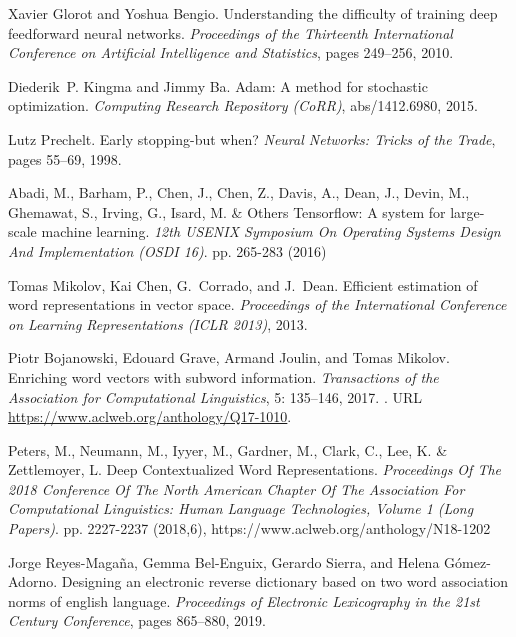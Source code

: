 \documentclass{article}
\begin{document}
\begin{thebibliography}{45}
Xavier Glorot and Yoshua Bengio.
\newblock Understanding the difficulty of training deep feedforward neural
  networks.
\newblock \emph{Proceedings of the Thirteenth International Conference on
  Artificial Intelligence and Statistics}, pages 249--256, 2010.

Diederik~P. Kingma and Jimmy Ba.
\newblock Adam: A method for stochastic optimization.
\newblock \emph{Computing Research Repository (CoRR)}, abs/1412.6980, 2015.

Lutz Prechelt.
\newblock Early stopping-but when?
\newblock \emph{Neural Networks: Tricks of the Trade}, pages 55--69, 1998.

Abadi, M., Barham, P., Chen, J., Chen, Z., Davis, A., Dean, J., Devin, M., Ghemawat, S., Irving, G., Isard, M. \& Others Tensorflow: A system for large-scale machine learning. {\em 12th {USENIX} Symposium On Operating Systems Design And Implementation ({OSDI} 16)}. pp. 265-283 (2016)

Tomas Mikolov, Kai Chen, G.~Corrado, and J.~Dean.
\newblock Efficient estimation of word representations in vector space.
\newblock \emph{Proceedings of the International Conference on Learning Representations (ICLR 2013)}, 2013.

Piotr Bojanowski, Edouard Grave, Armand Joulin, and Tomas Mikolov.
\newblock Enriching word vectors with subword information.
\newblock \emph{Transactions of the Association for Computational Linguistics},
  5: 135--146, 2017.
\newblock {}.
\newblock URL \url{https://www.aclweb.org/anthology/Q17-1010}.

Peters, M., Neumann, M., Iyyer, M., Gardner, M., Clark, C., Lee, K. \& Zettlemoyer, L. Deep Contextualized Word Representations. {\em Proceedings Of The 2018 Conference Of The North American Chapter Of The Association For Computational Linguistics: Human Language Technologies, Volume 1 (Long Papers)}. pp. 2227-2237 (2018,6), https://www.aclweb.org/anthology/N18-1202


Jorge Reyes-Maga{\~n}a, Gemma Bel-Enguix, Gerardo Sierra, and Helena
  G{\'o}mez-Adorno.
\newblock Designing an electronic reverse dictionary based on two word
  association norms of english language.
\newblock \emph{Proceedings of Electronic Lexicography in the 21st Century
  Conference}, pages 865--880, 2019.


\end{thebibliography}
\end{document}
